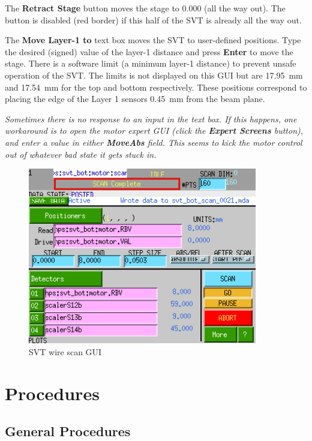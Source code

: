 \documentclass[12pt]{report}
\begin{document}
The \textbf{Retract Stage} button moves the stage to 0.000 (all the way out).
The button is disabled (red border) if this half of the SVT is already all the way out.

The \textbf{Move Layer-1 to} text box moves the SVT to user-defined positions.
Type the desired (signed) value of the layer-1 distance and press \textbf{Enter} to move the stage.
There is a software limit (a minimum layer-1 distance) to prevent unsafe operation of the SVT. The limits is not displayed on this GUI but are 17.95~mm and 17.54~mm for the top and bottom respectively.  These positions correspond to placing the edge of the Layer 1 sensors 0.45~mm from the beam plane.

\emph{Sometimes there is no response to an input in the text box. If this happens, one workaround is to open the motor expert GUI (click the \textbf{Expert Screens} button), and enter a value in either \textbf{MoveAbs} field. This seems to kick the motor control out of whatever bad state it gets stuck in.}

\begin{figure}[ht!]
\centering
\includegraphics[width=10cm]{svt_wirescan_gui}
\caption{SVT wire scan GUI}
\label{scannergui}
\end{figure}




\chapter{Procedures}


\section{General Procedures}
\label{sec:proc_general_beamchecklist}
\end{document}
